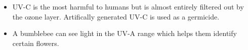 \begin{itemize}
\item UV-C is the most harmful to humans but is almost entirely filtered out by the ozone layer. Artifically generated UV-C is used as a germicide.


\item A bumblebee can see light in the UV-A range which helps them identify certain flowers.
\end{itemize}





